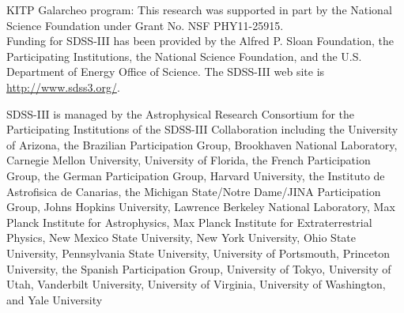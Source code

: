 \documentclass[12pt, preprint]{aastex}
\begin{document}
  KITP Galarcheo program: This research was supported in part by the National Science Foundation under Grant No. NSF PHY11-25915.\\

Funding for SDSS-III has been provided by the Alfred P. Sloan Foundation, the Participating Institutions, 
the National Science Foundation, and the U.S. Department of Energy Office of Science. The SDSS-III web site is \url{http://www.sdss3.org/}.

SDSS-III is managed by the Astrophysical Research Consortium for the Participating Institutions of the SDSS-III Collaboration
 including the University of Arizona, the Brazilian Participation Group, Brookhaven National Laboratory, Carnegie Mellon University, 
 University of Florida, the French Participation Group, the German Participation Group, Harvard University, the Instituto de Astrofisica 
 de Canarias, the Michigan State/Notre Dame/JINA Participation Group, Johns Hopkins University, Lawrence Berkeley National Laboratory, 
 Max Planck Institute for Astrophysics, Max Planck Institute for Extraterrestrial Physics, New Mexico State University, New York University, 
 Ohio State University, Pennsylvania State University, University of Portsmouth, Princeton University, the Spanish Participation Group, 
 University of Tokyo, University of Utah, Vanderbilt University, University of Virginia, University of Washington, and Yale University


\end{document}
